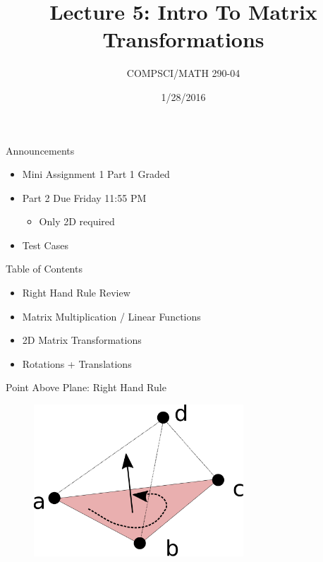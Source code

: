 \documentclass{beamer}
\title{Lecture 5: Intro To Matrix Transformations}
\date{1/28/2016}
\institute{Chris Tralie, Duke University}
\author{COMPSCI/MATH 290-04}
\begin{document}
\frame{\titlepage}

\begin{frame}{Announcements}

\begin{itemize}[label=$\blacktriangleright$]
    \item Mini Assignment 1 Part 1 Graded
    \item Part 2 Due Friday 11:55 PM
    \begin{itemize}[label=$\vartriangleright$]
        \item Only 2D required
    \end{itemize}
    \item Test Cases  %
\end{itemize}

\end{frame}

\begin{frame}{Table of Contents}

\begin{itemize}[label=$\blacktriangleright$]
	\item Right Hand Rule Review
\end{itemize}
\begin{itemize}[label=$\vartriangleright$]
    \item Matrix Multiplication / Linear Functions
    \item 2D Matrix Transformations
    \item Rotations + Translations
    
\end{itemize}

\end{frame}

\begin{frame}{Point Above Plane: Right Hand Rule}
\begin{figure}[t]
	\centering
    \includegraphics[width=0.7\textwidth]{pointAbovePlaneSketch.pdf}
\end{figure}
\end{frame}
\end{document}
